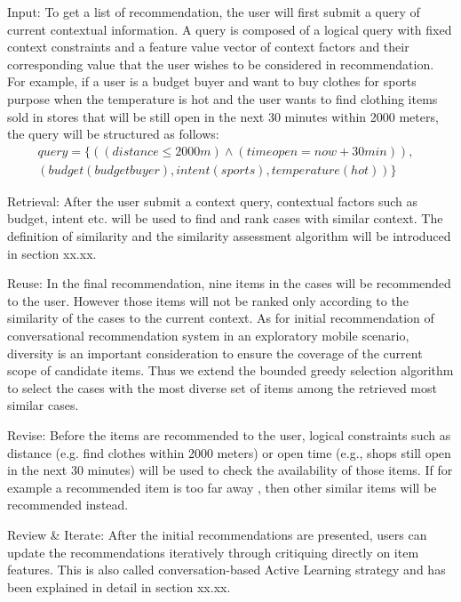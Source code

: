 Input: To get a list of recommendation, the user will first submit a query of current contextual information. A query is composed of a logical query with fixed context constraints and a feature value vector of context factors and their corresponding value that the user wishes to be considered in recommendation. For example, if a user is a budget buyer and want to buy clothes for sports purpose when the temperature is hot and the user wants to find clothing items sold in stores that will be still open in the next 30 minutes within 2000 meters, the query will be structured as follows:
\begin{equation} \label{eq:query}
\begin{split}
	query =  \{((distance \leq 2000m)\wedge(timeopen = now+30min)), &\\
	              (budget (budget buyer), intent (sports), temperature (hot))\} &
\end{split}
\end{equation}

Retrieval: After the user submit a context query, contextual factors such as budget, intent etc. will be used to find and rank cases with similar context. The definition of similarity and the similarity assessment algorithm will be introduced in section xx.xx. 

Reuse: In the final recommendation, nine items in the cases will be recommended to the user. However those items will not be ranked only according to the similarity of the cases to the current context. As for initial recommendation of conversational recommendation system in an exploratory mobile scenario, diversity is an important consideration to ensure the coverage of the current scope of candidate items. Thus we extend the bounded greedy selection algorithm to select the cases with the most diverse set of items among the retrieved most similar cases. 

Revise: Before the items are recommended to the user, logical constraints such as distance (e.g. find clothes within 2000 meters) or open time (e.g., shops still open in the next 30 minutes) will be used to check the availability of those items. If for example a recommended item is too far away , then other similar items will be recommended instead.

Review \& Iterate: After the initial recommendations are presented, users can update the recommendations iteratively through critiquing directly on item features. This is also called conversation-based Active Learning strategy and has been explained in detail in section xx.xx.

